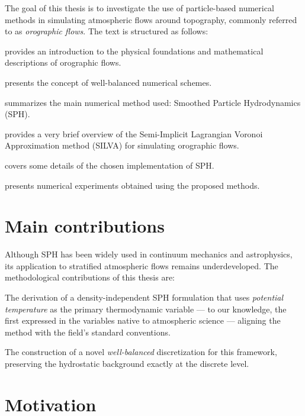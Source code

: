 \documentclass[../main.tex]{subfiles}
\begin{document}
\label{chap:Introduction}

The goal of this thesis is to investigate the use of particle-based numerical methods in simulating atmospheric flows around topography, commonly referred to as \emph{orographic flows}. The text is structured as follows:

\begin{compactenum}
    \item {} provides an introduction to the physical foundations and mathematical descriptions of orographic flows.
    \item {} presents the concept of well-balanced numerical schemes.
    \item {} summarizes the main numerical method used: Smoothed Particle Hydrodynamics (SPH).
    \item {} provides a very brief overview of the Semi-Implicit Lagrangian Voronoi Approximation method (SILVA) for simulating orographic flows.
    \item {} covers some details of the chosen implementation of SPH.
    \item {} presents numerical experiments obtained using the proposed methods.
\end{compactenum}

\section*{Main contributions}
Although SPH has been widely used in continuum mechanics and astrophysics, its application to stratified atmospheric flows remains underdeveloped. The methodological contributions of this thesis are:
\begin{compactenum}
    \item The derivation of a density-independent SPH formulation that uses \emph{potential temperature} as the primary thermodynamic variable --- to our knowledge, the first expressed in the variables native to atmospheric science --- aligning the method with the field's standard conventions.
    \item The construction of a novel \emph{well-balanced} discretization for this framework, preserving the hydrostatic background exactly at the discrete level.
\end{compactenum}

\section*{Motivation}
\end{document}

